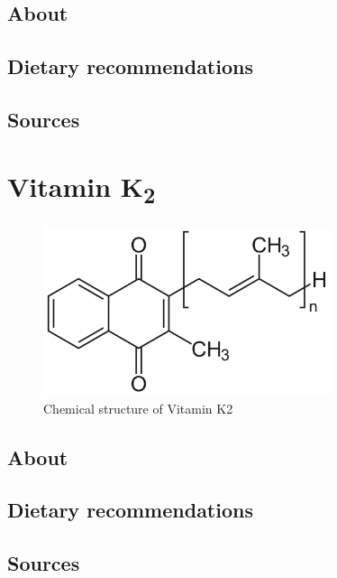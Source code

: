 \documentclass{book}
\begin{document}
\section{About}


\section{Dietary recommendations}


\section{Sources}


\chapter{Vitamin K\textsubscript{2}}
\begin{figure}[h]
	\caption{Chemical structure of Vitamin K2}
	\centering \includegraphics[width=0.75\textwidth]{images/Vitamin_K2_chemical_structure}
\end{figure}
\newpage

\section{About}


\section{Dietary recommendations}


\section{Sources}
\end{document}
